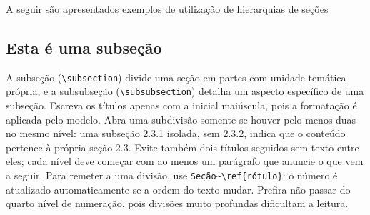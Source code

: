 A seguir são apresentados exemplos de utilização de hierarquias de seções

\subsection{Esta é uma subseção}
\label{subsec:exemplo_subsecao}

\begin{orientacao}
  A subseção (\texttt{\textbackslash subsection}) divide uma seção em partes com unidade temática própria, e a subsubseção (\texttt{\textbackslash subsubsection}) detalha um aspecto específico de uma subseção. Escreva os títulos apenas com a inicial maiúscula, pois a formatação é aplicada pelo modelo. Abra uma subdivisão somente se houver pelo menos duas no mesmo nível: uma subseção 2.3.1 isolada, sem 2.3.2, indica que o conteúdo pertence à própria seção 2.3. Evite também dois títulos seguidos sem texto entre eles; cada nível deve começar com ao menos um parágrafo que anuncie o que vem a seguir. Para remeter a uma divisão, use \texttt{Seção\textasciitilde\textbackslash ref\{rótulo\}}: o número é atualizado automaticamente se a ordem do texto mudar. Prefira não passar do quarto nível de numeração, pois divisões muito profundas dificultam a leitura.
\end{orientacao}

